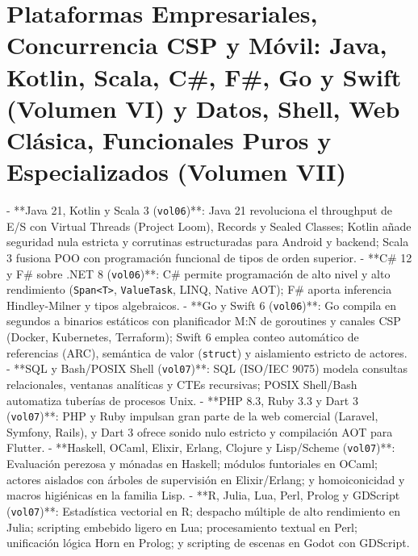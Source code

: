 \documentclass{book}
\begin{document}
\section{Plataformas Empresariales, Concurrencia CSP y Móvil: Java, Kotlin, Scala, C\#, F\#, Go y Swift (Volumen VI) y Datos, Shell, Web Clásica, Funcionales Puros y Especializados (Volumen VII)}

- **Java 21, Kotlin y Scala 3 (\texttt{vol06})**: Java 21 revoluciona el throughput de E/S con Virtual Threads (Project Loom), Records y Sealed Classes; Kotlin añade seguridad nula estricta y corrutinas estructuradas para Android y backend; Scala 3 fusiona POO con programación funcional de tipos de orden superior.
- **C\# 12 y F\# sobre .NET 8 (\texttt{vol06})**: C\# permite programación de alto nivel y alto rendimiento (\texttt{Span<T>}, \texttt{ValueTask}, LINQ, Native AOT); F\# aporta inferencia Hindley-Milner y tipos algebraicos.
- **Go y Swift 6 (\texttt{vol06})**: Go compila en segundos a binarios estáticos con planificador M:N de goroutines y canales CSP (Docker, Kubernetes, Terraform); Swift 6 emplea conteo automático de referencias (ARC), semántica de valor (\texttt{struct}) y aislamiento estricto de actores.
- **SQL y Bash/POSIX Shell (\texttt{vol07})**: SQL (ISO/IEC 9075) modela consultas relacionales, ventanas analíticas y CTEs recursivas; POSIX Shell/Bash automatiza tuberías de procesos Unix.
- **PHP 8.3, Ruby 3.3 y Dart 3 (\texttt{vol07})**: PHP y Ruby impulsan gran parte de la web comercial (Laravel, Symfony, Rails), y Dart 3 ofrece sonido nulo estricto y compilación AOT para Flutter.
- **Haskell, OCaml, Elixir, Erlang, Clojure y Lisp/Scheme (\texttt{vol07})**: Evaluación perezosa y mónadas en Haskell; módulos funtoriales en OCaml; actores aislados con árboles de supervisión en Elixir/Erlang; y homoiconicidad y macros higiénicas en la familia Lisp.
- **R, Julia, Lua, Perl, Prolog y GDScript (\texttt{vol07})**: Estadística vectorial en R; despacho múltiple de alto rendimiento en Julia; scripting embebido ligero en Lua; procesamiento textual en Perl; unificación lógica Horn en Prolog; y scripting de escenas en Godot con GDScript.
\end{document}
